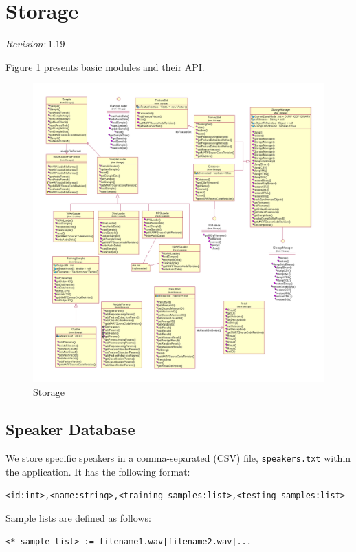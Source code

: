 \section{Storage}

$Revision: 1.19 $

Figure \ref{fig:storage}
presents basic  modules and their API.

\begin{figure}
	\centering
	\includegraphics[angle=90,totalheight=660pt,width=550pt]{../graphics/arch/storage.png}
	\caption{Storage}
	\label{fig:storage}
\end{figure}

\subsection{Speaker Database}

We store specific speakers in a comma-separated (CSV) file, \verb+speakers.txt+
within the application.
It has the following format:

\verb+<id:int>,<name:string>,<training-samples:list>,<testing-samples:list>+

Sample lists are defined as follows:

\verb+<*-sample-list> := filename1.wav|filename2.wav|...+



